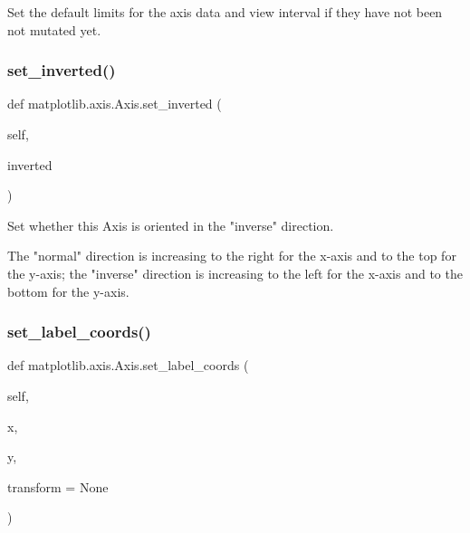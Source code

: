 \begin{DoxyVerb}Set the default limits for the axis data and view interval if they
have not been not mutated yet.
\end{DoxyVerb}
 \mbox{\label{classmatplotlib_1_1axis_1_1Axis_aa25f0fb82131a32356f32c5cfddc772b}} 
\subsubsection{\texorpdfstring{set\+\_\+inverted()}{set\_inverted()}}
{\footnotesize\ttfamily def matplotlib.\+axis.\+Axis.\+set\+\_\+inverted (\begin{DoxyParamCaption}\item[{}]{self,  }\item[{}]{inverted }\end{DoxyParamCaption})}

\begin{DoxyVerb}Set whether this Axis is oriented in the "inverse" direction.

The "normal" direction is increasing to the right for the x-axis and to
the top for the y-axis; the "inverse" direction is increasing to the
left for the x-axis and to the bottom for the y-axis.
\end{DoxyVerb}
 \mbox{\label{classmatplotlib_1_1axis_1_1Axis_a57d75f6277de367e7150b7add62f5208}} 
\subsubsection{\texorpdfstring{set\+\_\+label\+\_\+coords()}{set\_label\_coords()}}
{\footnotesize\ttfamily def matplotlib.\+axis.\+Axis.\+set\+\_\+label\+\_\+coords (\begin{DoxyParamCaption}\item[{}]{self,  }\item[{}]{x,  }\item[{}]{y,  }\item[{}]{transform = {\ttfamily None} }\end{DoxyParamCaption})}

